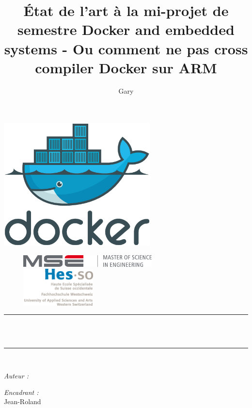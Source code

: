 \documentclass[11pt,a4paper,oneside]{report}
\title{État de l'art à la mi-projet de semestre Docker and embedded systems - Ou comment ne pas cross compiler Docker sur ARM}
\author{Gary \bsc{Marigliano}}
\begin{document}
\begin{titlepage}
\begin{center}

\includegraphics[width=0.6\textwidth]{img/docker_logo}\\[1cm]

\begin{figure}[htbp]
\begin{minipage}[c]{.45\linewidth}
\begin{flushleft}
\includegraphics[width=7cm]{img/mse_logo}
\end{flushleft}
\end{minipage}
\hfill
\begin{minipage}[c]{.45\linewidth}
\begin{flushright}
\includegraphics[height=2cm]{img/logo_hes-so}
\end{flushright}
\end{minipage}
\end{figure}

\rule{\linewidth}{0.5mm} \\[0.4cm]
{ \huge \bfseries \thetitle \\[0.4cm] }
\rule{\linewidth}{0.5mm} \\[1.5cm]

\noindent
\begin{minipage}{0.4\textwidth}
  \begin{flushleft} \large
    \emph{Auteur :}\\
    \theauthor
  \end{flushleft}
\end{minipage}%
\begin{minipage}{0.4\textwidth}
  \begin{flushright} \large
    \emph{Encadrant :} \\
    Jean-Roland 
  \end{flushright}
\end{minipage}


\end{center}
\end{titlepage}
\end{document}
